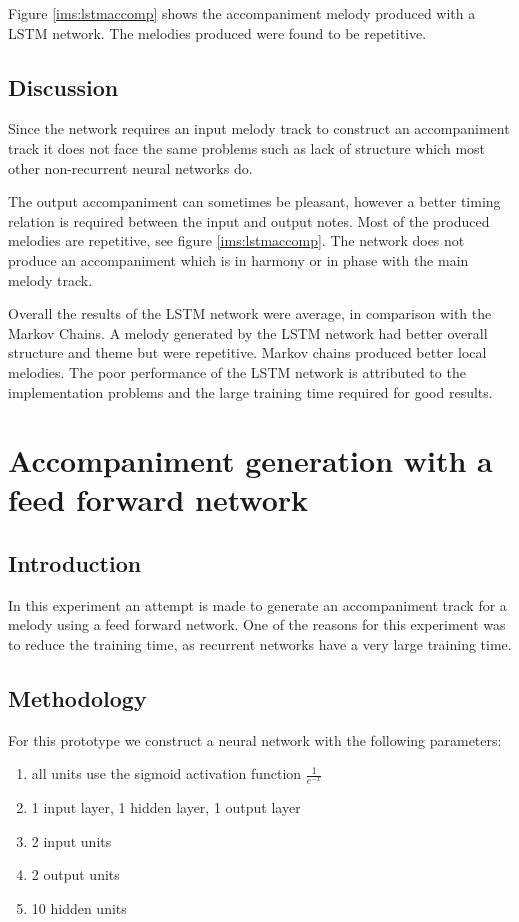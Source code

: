 Figure \ref{ims:lstmaccomp} shows the accompaniment melody produced with a \ac{LSTM} network. The melodies produced were found to be repetitive.


\section{Discussion}
Since the network requires an input melody track to construct an accompaniment track it does not face the same problems such as lack of structure which most other non-recurrent neural networks do.

The output accompaniment can sometimes be pleasant, however a better timing relation is required between the input and output notes. Most of the produced melodies are repetitive, see figure \ref{ims:lstmaccomp}. The network does not produce an accompaniment which is in harmony or in phase with the main melody track.

Overall the results of the \ac{LSTM} network were average, in comparison with the Markov Chains. A melody generated by the \ac{LSTM} network had better overall structure and theme but were repetitive. Markov chains produced better local melodies.
The poor performance of the \ac{LSTM} network is attributed to the implementation problems and the large training time required for good results.

\chapter{Accompaniment generation with a feed forward network}
\section{Introduction}
In this experiment an attempt is made to generate an accompaniment track for a melody using a feed forward network. One of the reasons for this experiment was to reduce the training time, as recurrent networks have a very large training time. 

\section{Methodology}
For this prototype we construct a neural network with the following parameters:
\begin{enumerate}
\item all units use the sigmoid activation function $\frac{1}{e^{-x}}$
\item 1 input layer, 1 hidden layer, 1 output layer
\item 2 input units
\item 2 output units
\item 10 hidden units
\end{enumerate}

